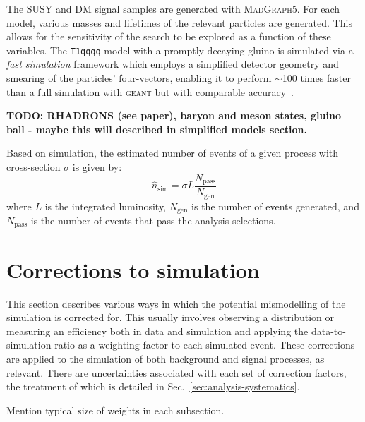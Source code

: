 The SUSY and DM signal samples are generated with \textsc{MadGraph5}. For each 
model, various masses and lifetimes of the relevant particles are generated. 
This allows for the sensitivity of the search to be explored as a function of 
these variables.
The \verb|T1qqqq| model with a promptly-decaying gluino is simulated via a 
\textit{fast simulation} framework which employs a simplified detector geometry 
and smearing of the particles' four-vectors, enabling it to perform $\sim$100 
times faster than a full simulation with \textsc{geant} but with comparable 
accuracy~\cite{fastsim}.

\textbf{TODO: RHADRONS (see paper), baryon and meson states, gluino ball - 
maybe this will described in simplified models section.}


Based on simulation, the estimated number of events of a given process with 
cross-section $\sigma$ is given by:
\begin{equation}
\hat{n}_\mathrm{sim} = \sigma L \frac{N_{\mathrm{pass}}}{N_{\mathrm{gen}}}
\end{equation}
where $L$ is the integrated luminosity, $N_{\mathrm{gen}}$ is the number of 
events generated, and $N_{\mathrm{pass}}$ is the number of events that pass the 
analysis selections.


\section{Corrections to simulation}
\label{sec:analysis-mccorrections}
This section describes various ways in which the potential mismodelling of the 
simulation is corrected for. This usually involves observing a distribution or 
measuring an efficiency both in data and simulation and applying the 
data-to-simulation ratio as a weighting factor to each simulated event. These 
corrections are applied to the simulation of both background and signal 
processes, as relevant.
There are uncertainties associated with each set of correction factors, the 
treatment of which is detailed in Sec.~\ref{sec:analysis-systematics}.

Mention typical size of weights in each subsection.

